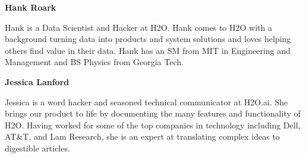 \textbf{Hank Roark}

Hank is a Data Scientist and Hacker at H2O. Hank comes to H2O with a background turning data into products and system solutions and loves helping others find value in their data.  Hank has an SM from MIT in Engineering and Management and BS Physics from Georgia Tech.

\textbf{Jessica Lanford}

Jessica is a word hacker and seasoned technical communicator at H2O.ai. She brings our product to life by documenting the many features and functionality of H2O. Having worked for some of the top companies in technology including Dell, AT$\&$T, and Lam Research, she is an expert at translating complex ideas to digestible articles.



